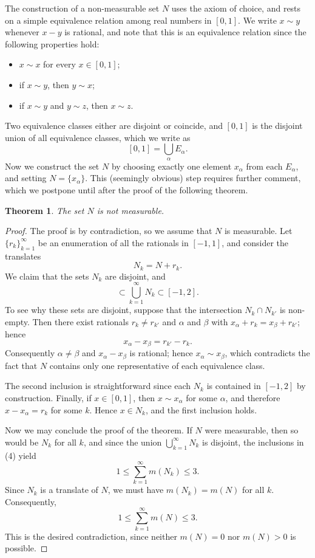 \documentclass[11pt,openany]{book}
\newtheorem{theorem}{Theorem}[section]
\begin{document}
The construction of a non-measurable set $N$ uses the axiom of choice, and rests on a simple equivalence relation among real numbers in $[0,1]$. We write $x\sim y$ whenever $x-y$ is rational, and note that this is an equivalence relation since the following properties hold:
\begin{itemize}
\item $x\sim x$ for every $x\in[0,1]$;
\item if $x\sim y$, then $y\sim x$;
\item if $x\sim y$ and $y\sim z$, then $x\sim z$.
\end{itemize}
Two equivalence classes either are disjoint or coincide, and $[0,1]$ is the disjoint union of all equivalence classes, which we write as
\[
 [0,1]=\bigcup_\alpha E_\alpha.
\]
Now we construct the set $N$ by choosing exactly one element $x_\alpha$ from each $E_\alpha$, and setting $N=\{x_\alpha\}$. This (seemingly obvious) step requires further comment, which we postpone until after the proof of the following theorem.

\begin{theorem}
The set $N$ is not measurable.
\end{theorem}

\begin{proof}
The proof is by contradiction, so we assume that $N$ is measurable. Let $\{r_k\}_{k=1}^{\infty}$ be an enumeration of all the rationals in $[-1,1]$, and consider the translates
\[
 N_k=N+r_k.
\]
We claim that the sets $N_k$ are disjoint, and
\begin{equation}
 [0,1]\subset\bigcup_{k=1}^{\infty}N_k\subset[-1,2].
 \tag{4}
\end{equation}
To see why these sets are disjoint, suppose that the intersection $N_k\cap N_{k'}$ is non-empty. Then there exist rationals $r_k\ne r_{k'}$ and $\alpha$ and $\beta$ with $x_\alpha+r_k=x_\beta+r_{k'}$; hence
\[
 x_\alpha-x_\beta=r_{k'}-r_k.
\]
Consequently $\alpha\ne\beta$ and $x_\alpha-x_\beta$ is rational; hence $x_\alpha\sim x_\beta$, which contradicts the fact that $N$ contains only one representative of each equivalence class.

The second inclusion is straightforward since each $N_k$ is contained in $[-1,2]$ by construction. Finally, if $x\in[0,1]$, then $x\sim x_\alpha$ for some $\alpha$, and therefore $x-x_\alpha=r_k$ for some $k$. Hence $x\in N_k$, and the first inclusion holds.

Now we may conclude the proof of the theorem. If $N$ were measurable, then so would be $N_k$ for all $k$, and since the union $\bigcup_{k=1}^{\infty}N_k$ is disjoint, the inclusions in (4) yield
\[
 1\le\sum_{k=1}^{\infty}m(N_k)\le3.
\]
Since $N_k$ is a translate of $N$, we must have $m(N_k)=m(N)$ for all $k$. Consequently,
\[
 1\le\sum_{k=1}^{\infty}m(N)\le3.
\]
This is the desired contradiction, since neither $m(N)=0$ nor $m(N)>0$ is possible.
\end{proof}
\end{document}
